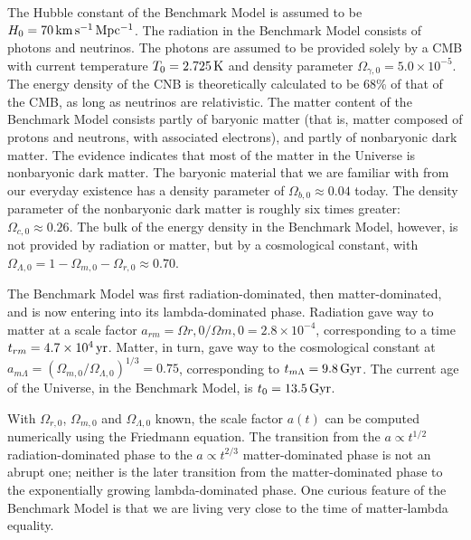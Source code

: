 \documentclass[a4paper,11pt]{article}
\begin{document}
{\noindent}The Hubble constant of the Benchmark Model is assumed to be $H_0=70\,{\rm km\,s^{-1}\,Mpc^{-1}}$. The radiation in the Benchmark Model consists of photons and neutrinos. The photons are assumed to be provided solely by a CMB with current temperature $T_0=2.725\,{\rm K}$ and density parameter $\Omega_{\gamma,0}=5.0\times10^{-5}$. The energy density of the CNB is theoretically calculated to be 68\% of that of the CMB, as long as neutrinos are relativistic. The matter content of the Benchmark Model consists partly of baryonic matter (that is, matter composed of protons and neutrons, with associated electrons), and partly of nonbaryonic dark matter. The evidence indicates that most of the matter in the Universe is nonbaryonic dark matter. The baryonic material that we are familiar with from our everyday existence has a density parameter of $\Omega_{b,0}\approx0.04$ today. The density parameter of the nonbaryonic dark matter is roughly six times greater: $\Omega_{c,0}\approx0.26$. The bulk of the energy density in the Benchmark Model, however, is not provided by radiation or matter, but by a cosmological constant, with $\Omega_{\Lambda,0}=1-\Omega_{m,0}-\Omega_{r,0}\approx0.70$.

{\noindent}The Benchmark Model was first radiation-dominated, then matter-dominated, and is now entering into its lambda-dominated phase. Radiation gave way to matter at a scale factor $a_{rm}=\Omega{r,0}/\Omega{m,0}=2.8\times10^{-4}$, corresponding to a time $t_{rm}=4.7\times10^4\,{\rm yr}$. Matter, in turn, gave way to the cosmological constant at $a_{m\Lambda}=(\Omega_{m,0}/\Omega_{\Lambda,0})^{1/3}=0.75$, corresponding to $t_{m\Lambda}=9.8\,{\rm Gyr}$. The current age of the Universe, in the Benchmark Model, is $t_0=13.5\,{\rm Gyr}$.

{\noindent}With $\Omega_{r,0}$, $\Omega_{m,0}$ and $\Omega_{\Lambda,0}$ known, the scale factor $a(t)$ can be computed numerically using the Friedmann equation. The transition from the $a\propto t^{1/2}$ radiation-dominated phase to the $a\propto t^{2/3}$ matter-dominated phase is not an abrupt one; neither is the later transition from the matter-dominated phase to the exponentially growing lambda-dominated phase. One curious feature of the Benchmark Model is that we are living very close to the time of matter-lambda equality.


%
%
\end{document}
